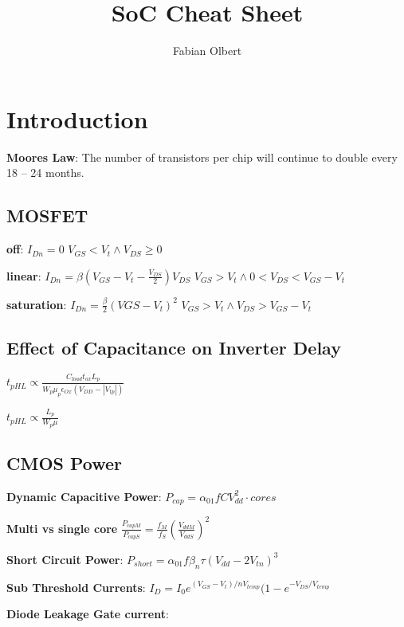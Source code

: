 \documentclass[english]{latex4ei/latex4ei_sheet}
\title{SoC Cheat Sheet}
\author{Fabian Olbert}					%
\begin{document}
\maketitle	%

\section{Introduction}

\textbf{Moores Law}: The number of transistors per chip will continue to double every 18 – 24 months.

\subsection{MOSFET}
\textbf{off}: \qquad $I_{Dn} = 0$ \qquad $V_{GS} < V_t \wedge V_{DS} \geq 0$

\textbf{linear}: \qquad $I_{Dn} = \beta (V_{GS} - V_t - \frac{V_{DS}}{2})V_{DS} $ \qquad $V_{GS} > V_t \wedge  0 < V_{DS} < V_{GS} - V_t$

\textbf{saturation}: \qquad $I_{Dn} = \frac{\beta}{2} (V{GS} - V_t)^2$ \qquad $V_{GS} > V_t \wedge  V_{DS} > V_{GS} - V_t$

\subsection{Effect of Capacitance on Inverter Delay}
$t_{pHL} \varpropto \frac{C_{load} t_{ox} L_p}{W_p \mu_p \epsilon_{Ox} (V_{DD} - |V_{tp}|)}$

$t_{pHL} \varpropto \frac{L_p}{W_p \mu}$

\subsection{CMOS Power}
\textbf{Dynamic Capacitive Power}: $P_{cap} = \alpha_{01} f C V_{dd}^2 \cdot cores$

\textbf{Multi vs single core} $\frac{P_{capM}}{P_{capS}} = \frac{f_M}{f_S} (\frac{V_{ddM}}{V_{ddS}})^2$

\textbf{Short Circuit Power}: $P_{short} = \alpha_{01} f \beta_n \tau (V_{dd} - 2 V_{tn})^3$

\textbf{Sub Threshold Currents}: $I_D = I_0 e^{(V_{GS} - V_t) / n V_{temp}} (1 - e^{-V_{DS} / V_{temp}}$

\textbf{Diode Leakage Gate current}:

\end{document}
